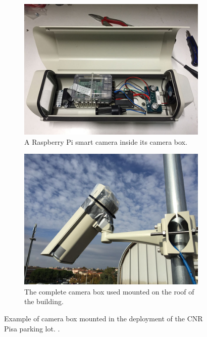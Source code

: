 \begin{figure}
	\centering
    \begin{subfigure}{0.48\columnwidth}
		\includegraphics[width=\columnwidth]{camera_inside}
        \caption{A Raspberry Pi smart camera inside its camera box.}
	\end{subfigure} %
    \begin{subfigure}{0.48\columnwidth}
		\includegraphics[width=\columnwidth]{camera_box}
        \caption{The complete camera box used mounted on the roof of the building.}
	\end{subfigure}

	\caption{Example of camera box mounted in the deployment of the CNR Pisa parking lot. .}
	\label{fig:mini:camera-box}
\end{figure}


